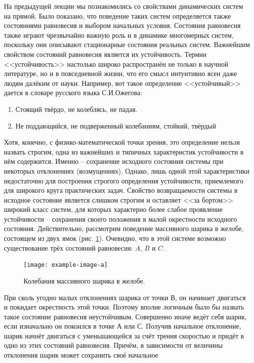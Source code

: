 \graphicspath{{fig/lect3/}}
На предыдущей лекции мы познакомились со свойствами динамических систем на прямой. Было показано, что поведение таких систем определяется также состояниями равновесия и выбором начальных условия. Состояния равновесия также играют чрезвычайно важную роль и в динамике многомерных систем, поскольку они описывают стационарные состояния реальных систем. Важнейшим свойством состояний равновесия является их устойчивость. Термин <<устойчивость>> настолько широко распространён не только в научной литературе, но и в повседневной жизни, что его смысл интуитивно ясен даже людям далёким от науки. Например, вот такое определение <<устойчивый>> дается в словаре русского языка С.И.Ожегова:
\begin{enumerate}
    \item Стоящий твёрдо, не колеблясь, не падая.
    \item Не поддающийся, не подверженный колебаниям, стойкий, твёрдый
\end{enumerate}
Хотя, конечно, с физико-математической точки зрения, это определение нельзя назвать строгим,  одна из важнейших и типичных характеристик устойчивости в нём содержится. Именно -- сохранение исходного состояния системы при некоторых отклонениях (возмущениях). Однако, лишь одной этой характеристики недостаточно для построения строгого определения устойчивости, приемлемого для широкого круга практических задач. Свойство возвращаемости системы в исходное состояние является слишком строгим и оставляет <<за бортом>> широкий класс систем, для которых характерно более слабое проявление устойчивости -- сохранения своего положения в малой окрестности исходного состояния. Действительно, рассмотрим поведение массивного шарика в желобе, состоящем из двух ямок (рис. \ref{fig:3.1}). Очевидно, что в этой системе возможно  существование трёх состояний   равновесия:
$A$, $B$ и $C$. 
\begin{figure}[h!]
    \centering
    \texttt{[image: example-image-a]}
    \label{fig:3.1}
    \caption{Колебания массивного шарика в желобе. }
\end{figure}
При сколь угодно малых отклонениях шарика от точки В, он начинает
двигаться и покидает окрестность этой точки. Поэтому вполне логичным было
бы назвать такое состояние равновесия неустойчивым. Совершенно иначе ведёт
себя шарик, если изначально он покоился в точке А или С. Получив начальное
отклонение, шарик начнёт двигаться с уменьшающейся за счёт трения
скоростью и придёт в одно из этих состояний равновесия. Причём, в
зависимости от величины отклонения шарик может сохранить своё начальное

